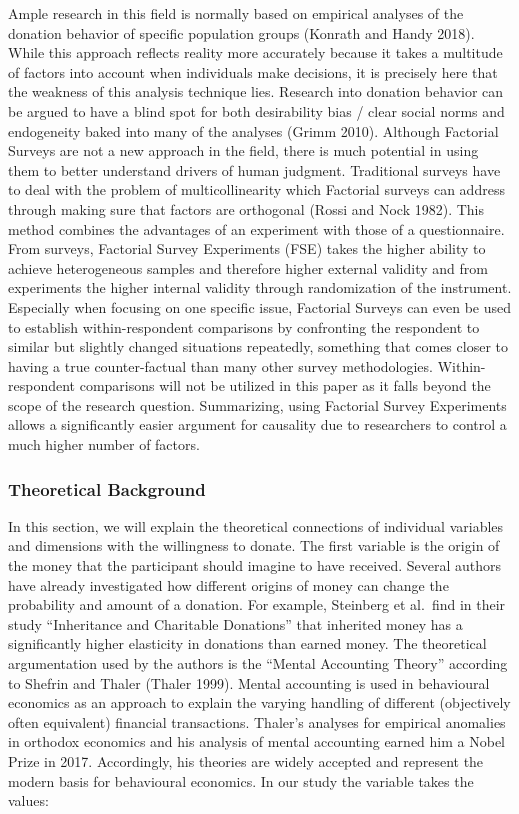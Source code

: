 \documentclass[
  12pt,
]{article}
\begin{document}
Ample research in this field is normally based on empirical analyses of
the donation behavior of specific population groups (Konrath and Handy
2018). While this approach reflects reality more accurately because it
takes a multitude of factors into account when individuals make
decisions, it is precisely here that the weakness of this analysis
technique lies. Research into donation behavior can be argued to have a
blind spot for both desirability bias / clear social norms and
endogeneity baked into many of the analyses (Grimm 2010). Although
Factorial Surveys are not a new approach in the field, there is much
potential in using them to better understand drivers of human judgment.
Traditional surveys have to deal with the problem of multicollinearity
which Factorial surveys can address through making sure that factors are
orthogonal (Rossi and Nock 1982). This method combines the advantages of
an experiment with those of a questionnaire. From surveys, Factorial
Survey Experiments (FSE) takes the higher ability to achieve
heterogeneous samples and therefore higher external validity and from
experiments the higher internal validity through randomization of the
instrument. Especially when focusing on one specific issue, Factorial
Surveys can even be used to establish within-respondent comparisons by
confronting the respondent to similar but slightly changed situations
repeatedly, something that comes closer to having a true counter-factual
than many other survey methodologies. Within-respondent comparisons will
not be utilized in this paper as it falls beyond the scope of the
research question. Summarizing, using Factorial Survey Experiments
allows a significantly easier argument for causality due to researchers
to control a much higher number of factors.

\hypertarget{theoretical-background}{%
\subsubsection{Theoretical Background}\label{theoretical-background}}

In this section, we will explain the theoretical connections of
individual variables and dimensions with the willingness to donate. The
first variable is the origin of the money that the participant should
imagine to have received. Several authors have already investigated how
different origins of money can change the probability and amount of a
donation. For example, Steinberg et al.~find in their study
``Inheritance and Charitable Donations'' that inherited money has a
significantly higher elasticity in donations than earned money. The
theoretical argumentation used by the authors is the ``Mental Accounting
Theory'' according to Shefrin and Thaler (Thaler 1999). Mental
accounting is used in behavioural economics as an approach to explain
the varying handling of different (objectively often equivalent)
financial transactions. Thaler's analyses for empirical anomalies in
orthodox economics and his analysis of mental accounting earned him a
Nobel Prize in 2017. Accordingly, his theories are widely accepted and
represent the modern basis for behavioural economics. In our study the
variable takes the values:
\end{document}
